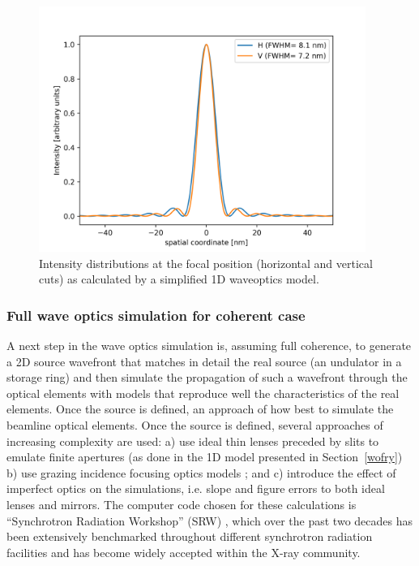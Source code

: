 \documentclass{iucr}              %
\begin{document}
\begin{figure}
\label{wofry1D}
\centering
\includegraphics[width=0.95\textwidth]{GRAPHICS/wofry1D.png}
\caption{Intensity distributions at the focal position (horizontal and vertical cuts) as calculated by a simplified 1D waveoptics model. 
}
\end{figure}


\subsubsection{Full wave optics simulation for coherent case}
\label{srw_se}

A next step in the wave optics simulation is, assuming full coherence, to generate a 2D source wavefront that matches in detail the real source (an undulator in a storage ring) and then simulate the propagation of such a wavefront through the optical elements with models that reproduce well the characteristics of the real elements. Once the source is defined, an approach of how best to simulate the beamline optical elements. 
Once the source is defined, several approaches of increasing complexity are used: a) use ideal thin lenses preceded by slits to emulate finite apertures (as done in the 1D model presented in Section~\ref{wofry}) b) use grazing incidence focusing optics models \cite{Canestrari2014}; and c) introduce the effect of imperfect optics on the simulations, i.e. slope and figure errors to both ideal lenses and mirrors. The computer code chosen for these calculations is ``Synchrotron Radiation Workshop'' (SRW) \cite{codeSRW}, which over the past two decades has been extensively benchmarked throughout different synchrotron radiation facilities and has become widely accepted within the X-ray community. 
\end{document}

